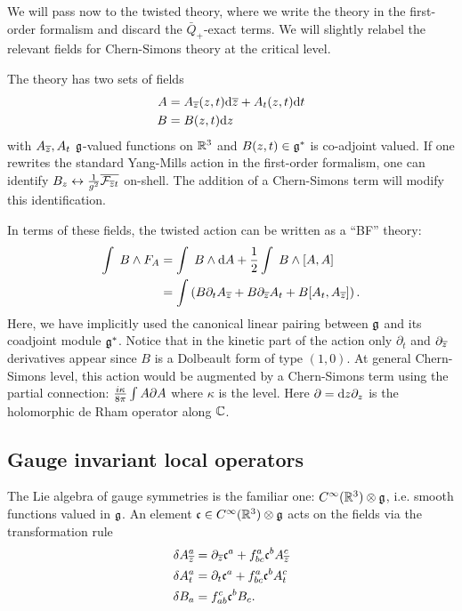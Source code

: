 \documentclass[11pt]{amsart}
\begin{document}
We will pass now to the twisted theory, where we write the theory in the first-order formalism and discard the $\bar{Q}_+$-exact terms. We will slightly relabel the relevant fields for Chern-Simons theory at the critical level. 

The theory has two sets of fields
\begin{align*}
A & = A_{{\overline{z}}} (z,t) {\rm d} {\overline{z}} + A_{t} (z, t) {\rm d} t \\
B & = B (z,t) {\rm d} z 
\end{align*}
with $A_{{\overline{z}}}, A_t$ $\mathfrak g$-valued functions on $\mathbb R^3$ and $B(z,t) \in \mathfrak g^*$ is co-adjoint valued. If one rewrites the standard Yang-Mills action in the first-order formalism, one can identify $B_z \leftrightarrow {1 \over g^2} \overline{\mathcal F_{{\overline{z}} t}}$ on-shell. The addition of a Chern-Simons term will modify this identification. 


In terms of these fields, the twisted action can be written as a ``BF'' theory:
\begin{align*}
\int \; B \wedge F_A & = \int \; B \wedge {\rm d} A +  \frac12 \int \; B \wedge [A,A] \\
& = \int \left(B \partial_t A_{{\overline{z}}} + B \partial_{{\overline{z}}} A_t + B [A_t, A_{\overline{z}}]\right) .
\end{align*}
Here, we have implicitly used the canonical linear pairing between $\mathfrak g$ and its coadjoint module $\mathfrak g^*$. 
Notice that in the kinetic part of the action only $\partial_t$ and $\partial_{{\overline{z}}}$ derivatives appear since $B$ is a Dolbeault form of type $(1,0)$. At general Chern-Simons level, this action would be augmented by a Chern-Simons term using the partial connection: ${i \kappa \over 8 \pi} \int A \partial A$ where $\kappa$ is the level.
Here $\partial = {\rm d} z \partial_z$ is the holomorphic de Rham operator along $\mathbb C$. 

\subsection{Gauge invariant local operators}

The Lie algebra of gauge symmetries is the familiar one: $C^\infty(\mathbb R^3) \otimes \mathfrak g$, i.e. smooth functions valued in $\mathfrak g$. 
An element $\mathfrak c \in C^\infty(\mathbb R^3) \otimes \mathfrak g$ acts on the fields via the transformation rule
\begin{align*}
\delta A^a_{\overline{z}} & = \partial_{{\overline{z}}} \mathfrak c^a + f^a_{bc} \mathfrak c^b A^c_{\overline{z}} \\
\delta A^a_t & = \partial_t \mathfrak c^a + f^a_{bc} \mathfrak c^b A^c_t  \\
\delta B_a & = f^c_{ab} \mathfrak c^b B_c .
\end{align*}
\end{document}
